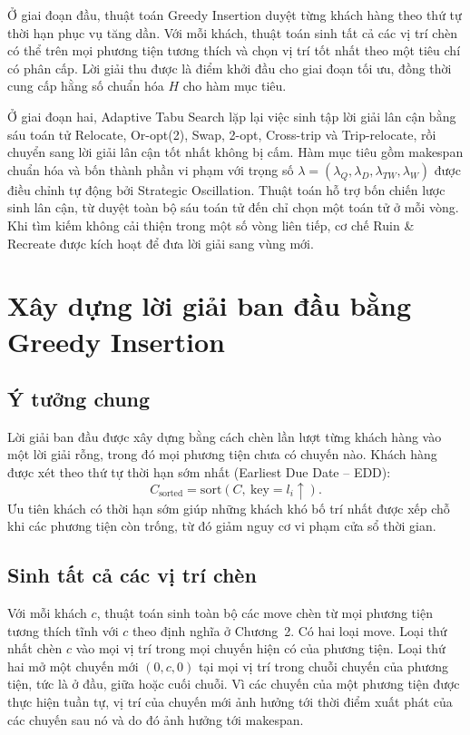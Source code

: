 \documentclass[../DoAn.tex]{subfiles}
\begin{document}
Ở giai đoạn đầu, thuật toán Greedy Insertion duyệt từng khách hàng theo thứ tự thời hạn phục vụ tăng dần. Với mỗi khách, thuật toán sinh tất cả các vị trí chèn có thể trên mọi phương tiện tương thích và chọn vị trí tốt nhất theo một tiêu chí có phân cấp. Lời giải thu được là điểm khởi đầu cho giai đoạn tối ưu, đồng thời cung cấp hằng số chuẩn hóa $H$ cho hàm mục tiêu.

Ở giai đoạn hai, Adaptive Tabu Search lặp lại việc sinh tập lời giải lân cận bằng sáu toán tử Relocate, Or-opt(2), Swap, 2-opt, Cross-trip và Trip-relocate, rồi chuyển sang lời giải lân cận tốt nhất không bị cấm. Hàm mục tiêu gồm makespan chuẩn hóa và bốn thành phần vi phạm với trọng số $\lambda = (\lambda_Q, \lambda_D, \lambda_{TW}, \lambda_W)$ được điều chỉnh tự động bởi Strategic Oscillation. Thuật toán hỗ trợ bốn chiến lược sinh lân cận, từ duyệt toàn bộ sáu toán tử đến chỉ chọn một toán tử ở mỗi vòng. Khi tìm kiếm không cải thiện trong một số vòng liên tiếp, cơ chế Ruin \& Recreate được kích hoạt để đưa lời giải sang vùng mới.

\section{Xây dựng lời giải ban đầu bằng Greedy Insertion}
\label{sec:greedy}

\subsection{Ý tưởng chung}

Lời giải ban đầu được xây dựng bằng cách chèn lần lượt từng khách hàng vào một lời giải rỗng, trong đó mọi phương tiện chưa có chuyến nào. Khách hàng được xét theo thứ tự thời hạn sớm nhất (Earliest Due Date -- EDD):
\begin{equation}
C_{\text{sorted}} = \mathrm{sort}\!\left(C,\ \text{key} = l_i \uparrow\right).
\end{equation}
Ưu tiên khách có thời hạn sớm giúp những khách khó bố trí nhất được xếp chỗ khi các phương tiện còn trống, từ đó giảm nguy cơ vi phạm cửa sổ thời gian.

\subsection{Sinh tất cả các vị trí chèn}

Với mỗi khách $c$, thuật toán sinh toàn bộ các move chèn từ mọi phương tiện tương thích tĩnh với $c$ theo định nghĩa ở Chương~2. Có hai loại move. Loại thứ nhất chèn $c$ vào mọi vị trí trong mọi chuyến hiện có của phương tiện. Loại thứ hai mở một chuyến mới $(0, c, 0)$ tại mọi vị trí trong chuỗi chuyến của phương tiện, tức là ở đầu, giữa hoặc cuối chuỗi. Vì các chuyến của một phương tiện được thực hiện tuần tự, vị trí của chuyến mới ảnh hưởng tới thời điểm xuất phát của các chuyến sau nó và do đó ảnh hưởng tới makespan.
\end{document}
